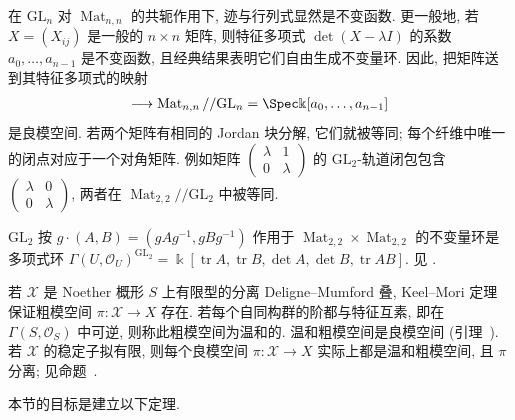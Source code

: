 \begin{example}\label{src:7.5.8}
在 $\mathrm{GL}_n$ 对 $\operatorname{Mat}_{n,n}$ 的共轭作用下, 迹与行列式显然是不变函数. 更一般地, 若 $X=(X_{ij})$ 是一般的 $n\times n$ 矩阵, 则特征多项式 $\det(X-\lambda I)$ 的系数 $a_0,\ldots,a_{n-1}$ 是不变函数, 且经典结果表明它们自由生成不变量环. 因此, 把矩阵送到其特征多项式的映射
\begin{align*}
[\operatorname{Mat}_{n,n}/\mathrm{GL}_n]\longrightarrow\operatorname{Mat}_{n,n}//\mathrm{GL}_n=\Spec\Bbbk[a_0,\ldots,a_{n-1}]
\end{align*}
是良模空间. 若两个矩阵有相同的 Jordan 块分解, 它们就被等同; 每个纤维中唯一的闭点对应于一个对角矩阵. 例如矩阵 $\begin{pmatrix}\lambda&1\\0&\lambda\end{pmatrix}$ 的 $\mathrm{GL}_2$-轨道闭包包含 $\begin{pmatrix}\lambda&0\\0&\lambda\end{pmatrix}$, 两者在 $\operatorname{Mat}_{2,2}//\mathrm{GL}_2$ 中被等同.
\end{example}
\begin{example}[同时共轭]\label{src:7.5.9}
$\mathrm{GL}_2$ 按 $g\cdot(A,B)=(gAg^{-1},gBg^{-1})$ 作用于 $\operatorname{Mat}_{2,2}\times\operatorname{Mat}_{2,2}$ 的不变量环是多项式环 $\Gamma(U,\mathcal O_U)^{\mathrm{GL}_2}=\Bbbk[\operatorname{tr}A,\operatorname{tr}B,\det A,\det B,\operatorname{tr}AB]$. 见 \cite{DCP17}.
\end{example}
\begin{example}[温和粗模空间]\label{src:7.5.10}
若 $\mathcal X$ 是 Noether 概形 $S$ 上有限型的分离 Deligne--Mumford 叠, Keel--Mori 定理~ 保证粗模空间 $\pi:\mathcal X\to X$ 存在. 若每个自同构群的阶都与特征互素, 即在 $\Gamma(S,\mathcal O_S)$ 中可逆, 则称此粗模空间为温和的. 温和粗模空间是良模空间 (引理~). 若 $\mathcal X$ 的稳定子拟有限, 则每个良模空间 $\pi:\mathcal X\to X$ 实际上都是温和粗模空间, 且 $\pi$ 分离; 见命题~.
\end{example}
本节的目标是建立以下定理.
